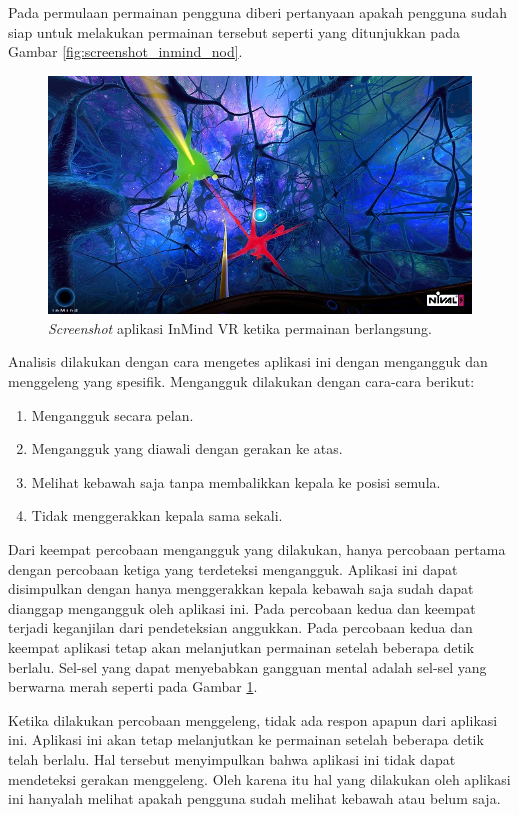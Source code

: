 Pada permulaan permainan pengguna diberi pertanyaan apakah pengguna sudah siap untuk melakukan permainan tersebut seperti yang ditunjukkan pada Gambar \ref{fig:screenshot_inmind_nod}.

\begin{figure}[htbp]
\centering
\includegraphics[scale=0.7]{Gambar/screenshot-inmind-gameplay.jpg}
\caption{\textit{Screenshot} aplikasi InMind VR ketika permainan berlangsung.}
\label{fig:screenshot_inmind_gameplay}
\end{figure}

Analisis dilakukan dengan cara mengetes aplikasi ini dengan mengangguk dan menggeleng yang spesifik. Mengangguk dilakukan dengan cara-cara berikut:
\begin{enumerate}
	\item Mengangguk secara pelan.
	\item Mengangguk yang diawali dengan gerakan ke atas.
	\item Melihat kebawah saja tanpa membalikkan kepala ke posisi semula.
	\item Tidak menggerakkan kepala sama sekali.
\end{enumerate}

Dari keempat percobaan mengangguk yang dilakukan, hanya percobaan pertama dengan percobaan ketiga yang terdeteksi mengangguk. Aplikasi ini dapat disimpulkan dengan hanya menggerakkan kepala kebawah saja sudah dapat dianggap mengangguk oleh aplikasi ini. Pada percobaan kedua dan keempat terjadi keganjilan dari pendeteksian anggukkan. Pada percobaan kedua dan keempat aplikasi tetap akan melanjutkan permainan setelah beberapa detik berlalu. Sel-sel yang dapat menyebabkan gangguan mental adalah sel-sel yang berwarna merah seperti pada Gambar \ref{fig:screenshot_inmind_gameplay}. 

Ketika dilakukan percobaan menggeleng, tidak ada respon apapun dari aplikasi ini. Aplikasi ini akan tetap melanjutkan ke permainan setelah beberapa detik telah berlalu. Hal tersebut menyimpulkan bahwa aplikasi ini tidak dapat mendeteksi gerakan menggeleng. Oleh karena itu hal yang dilakukan oleh aplikasi ini hanyalah melihat apakah pengguna sudah melihat kebawah atau belum saja.

